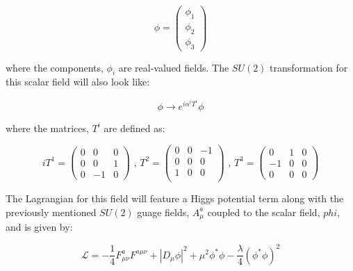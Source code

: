 \begin{equation}\label{eq:non_abelian_higgs_mechanism_phi}
\phi = 
  \begin{pmatrix}
    \phi_{1} \\
    \phi_{2} \\
    \phi_{3}
    \end{pmatrix}
\end{equation}

\noindent where the components, $\phi_{i}$ are real-valued fields.
The $SU(2)$ transformation for this scalar field will also look like:

\begin{equation}\label{eq:non_abelian_higgs_mechanism_transformation}
\phi \rightarrow e^{i\alpha^{i}T^{i}}\phi
\end{equation}

\noindent where the matrices, $T^{i}$ are defined as:

\tiny
\begin{equation}\label{eq:non_abelian_higgs_mechanism_generators}
iT^{1} = 
  \begin{pmatrix}
    0  &  0  &  0 \\
    0  &  0  &  1 \\
    0  & -1 &  0 
  \end{pmatrix}
\text{   ,    }
T^{2} = 
  \begin{pmatrix}
    0  &  0  & -1 \\
    0  &  0  &  0 \\
    1  &  0  &  0 \\ 
  \end{pmatrix}
\text{   ,   }
T^{3} = 
  \begin{pmatrix}
    0  &   1  &  0 \\
   -1 &   0  &  0 \\
    0  &   0  &  0
  \end{pmatrix}
\end{equation}
\normalsize

\noindent The Lagrangian for this field will feature a Higgs potential
term along with the previously mentioned $SU(2)$ guage fields, $A_{\mu}^{a}$ coupled
to the scalar field, $phi$, and is given by:

\begin{equation}\label{eq:non_abelian_higgs_mechanism_lagrangian}
\mathcal{L} = -\frac{1}{4}F_{\mu\nu}^{a}F^{a\mu\nu}+ |D_{\mu}\phi|^{2}
+ \mu^{2}\phi^{\ast}\phi - \frac{\lambda}{4}(\phi^{\ast}\phi)^{2}
\end{equation}

